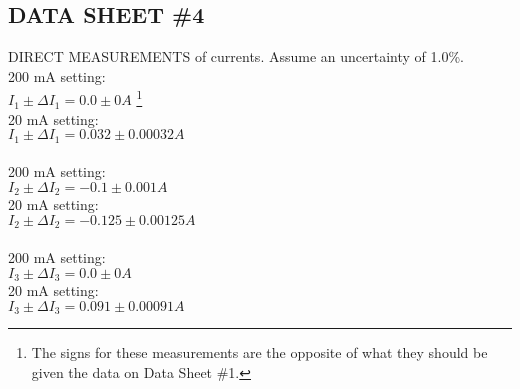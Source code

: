 \subsection{DATA SHEET \#4}
	\item DIRECT MEASUREMENTS of currents.  Assume an uncertainty of 1.0\%.\\
	200 mA setting:\\
	$I_1 \pm \Delta I_1 = 0.0 \pm 0 A$ \footnote{The signs for these measurements are the opposite of what they should be given the data on Data Sheet \#1.}\\ 
	20 mA setting:\\
	$I_1 \pm \Delta I_1 = 0.032 \pm 0.00032 A$\\ \\
	200 mA setting:\\
	$I_2 \pm \Delta I_2 = -0.1 \pm 0.001 A$\\ 
	20 mA setting:\\
	$I_2 \pm \Delta I_2 = -0.125 \pm 0.00125 A$\\ \\
	200 mA setting:\\
	$I_3 \pm \Delta I_3 = 0.0 \pm 0 A$\\ 
	20 mA setting:\\
	$I_3 \pm \Delta I_3 = 0.091 \pm 0.00091 A$\\ 
	